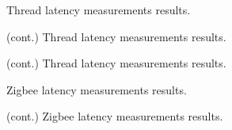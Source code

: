 
\begin{figure}
    \centering
    \caption{Thread latency measurements results.}
    \label{table:thread_latency}
\end{figure}

\begin{figure}
    \centering
    \caption{(cont.) Thread latency measurements results.}
\end{figure}

\begin{figure}
    \centering
    \caption{(cont.) Thread latency measurements results.}
\end{figure}

\begin{figure}
    \centering
    \caption{Zigbee latency measurements results.}
\end{figure}

\begin{figure}
    \centering
    \caption{(cont.) Zigbee latency measurements results.}
\end{figure}
